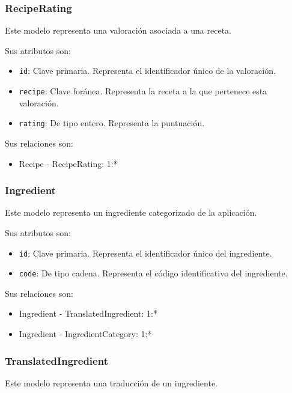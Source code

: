 \subsubsection{RecipeRating}

Este modelo representa una valoración asociada a una receta.

Sus atributos son:
\begin{itemize}
\item \texttt{id}: Clave primaria. Representa el identificador único de la
  valoración.
\item \texttt{recipe}: Clave foránea. Representa la receta a la que pertenece
  esta valoración.
\item \texttt{rating}: De tipo entero. Representa la puntuación.
\end{itemize}

Sus relaciones son:
\begin{itemize}
\item Recipe - RecipeRating: 1:*
\end{itemize}



\subsubsection{Ingredient}

Este modelo representa un ingrediente categorizado de la aplicación.

Sus atributos son:
\begin{itemize}
\item \texttt{id}: Clave primaria. Representa el identificador único del
  ingrediente.
\item \texttt{code}: De tipo cadena. Representa el código identificativo del
  ingrediente.
\end{itemize}

Sus relaciones son:
\begin{itemize}
\item Ingredient - TranslatedIngredient: 1:*
\item Ingredient - IngredientCategory: 1:*
\end{itemize}


\subsubsection{TranslatedIngredient}

Este modelo representa una traducción de un ingrediente.

